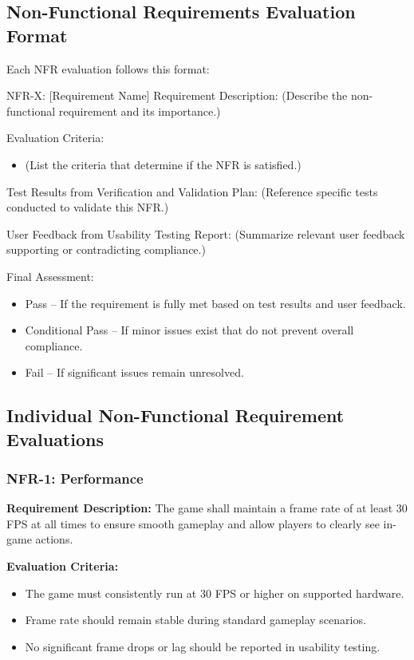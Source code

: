 \documentclass[12pt, titlepage]{article}
\begin{document}
\subsection{Non-Functional Requirements Evaluation Format}

Each NFR evaluation follows this format:

NFR-X: [Requirement Name]
Requirement Description:
(Describe the non-functional requirement and its importance.)

Evaluation Criteria:
\begin{itemize}
    \item (List the criteria that determine if the NFR is satisfied.)
\end{itemize}
Test Results from Verification and Validation Plan:
(Reference specific tests conducted to validate this NFR.)

User Feedback from Usability Testing Report:
(Summarize relevant user feedback supporting or contradicting compliance.)

Final Assessment:
\begin{itemize}
    \item Pass – If the requirement is fully met based on test results and user feedback.
    \item Conditional Pass – If minor issues exist that do not prevent overall compliance.
    \item Fail – If significant issues remain unresolved.
\end{itemize}

\subsection{Individual Non-Functional Requirement Evaluations}


\subsubsection{NFR-1: Performance}
\label{NFR1} 

\textbf{Requirement Description:}  
The game shall maintain a frame rate of at least 30 FPS at all times to ensure smooth gameplay and allow players to clearly see in-game actions.

\textbf{Evaluation Criteria:}  
\begin{itemize}
    \item The game must consistently run at 30 FPS or higher on supported hardware.
    \item Frame rate should remain stable during standard gameplay scenarios.
    \item No significant frame drops or lag should be reported in usability testing.
\end{itemize}
\end{document}
